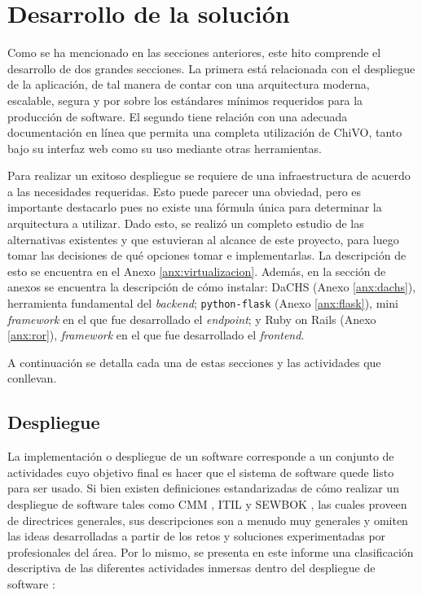 \section{Desarrollo de la solución}

Como se ha mencionado en las secciones anteriores, este hito comprende el desarrollo de dos grandes secciones. La primera está relacionada con el despliegue de la aplicación, de tal manera de contar con una arquitectura moderna, escalable, segura y por sobre los estándares mínimos requeridos para la producción de software. El segundo tiene relación con una adecuada documentación en línea que permita una completa utilización de ChiVO, tanto bajo su interfaz web como su uso mediante otras herramientas.

Para realizar un exitoso despliegue se requiere de una infraestructura de acuerdo a las necesidades requeridas. Esto puede parecer una obviedad, pero es importante destacarlo pues no existe una fórmula única para determinar la arquitectura a utilizar. Dado esto, se realizó un completo estudio de las alternativas existentes y que estuvieran al alcance de este proyecto, para luego tomar las decisiones de qu\'e opciones tomar e implementarlas. La descripción de esto se encuentra en el Anexo \ref{anx:virtualizacion}. Además, en la sección de anexos se encuentra la descripción de cómo instalar: DaCHS (Anexo \ref{anx:dachs}), herramienta fundamental del \emph{backend}; \texttt{python-flask} (Anexo \ref{anx:flask}), mini \emph{framework} en el que fue desarrollado el \emph{endpoint}; y Ruby on Rails (Anexo \ref{anx:ror}), \emph{framework} en el que fue desarrollado el \emph{frontend}.

A continuación se detalla cada una de estas secciones y las actividades que conllevan.

\subsection{Despliegue}

La implementación o despliegue de un software corresponde a un conjunto de actividades cuyo objetivo final es hacer que el sistema de software quede listo para ser usado. Si bien existen definiciones estandarizadas de cómo realizar un despliegue de software tales como CMM \cite{cmm}, ITIL \cite{itil} y SEWBOK \cite{swebok}, las cuales proveen de directrices generales, sus descripciones son a menudo muy generales y omiten las ideas desarrolladas a partir de los retos y soluciones experimentadas por profesionales del área. Por lo mismo, se presenta en este informe una clasificación descriptiva de las diferentes actividades inmersas dentro del despliegue de software \cite{deployActivities}:

